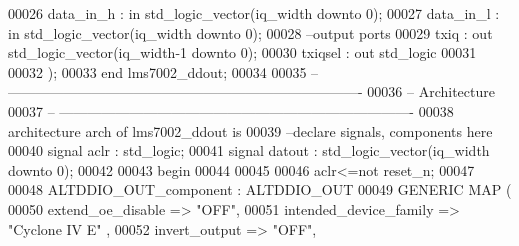 \begin{DoxyCode}
00026         \textcolor{vhdlchar}{data_in_h}   \textcolor{vhdlchar}{:} \textcolor{keywordflow}{in} \textcolor{comment}{std\_logic\_vector}\textcolor{vhdlchar}{(}\textcolor{vhdlchar}{iq_width} \textcolor{keywordflow}{downto} \textcolor{vhdllogic}{}\textcolor{vhdllogic}{0}\textcolor{vhdlchar}{)};
00027         \textcolor{vhdlchar}{data_in_l}   \textcolor{vhdlchar}{:} \textcolor{keywordflow}{in} \textcolor{comment}{std\_logic\_vector}\textcolor{vhdlchar}{(}\textcolor{vhdlchar}{iq_width} \textcolor{keywordflow}{downto} \textcolor{vhdllogic}{}\textcolor{vhdllogic}{0}\textcolor{vhdlchar}{)};
00028 \textcolor{keyword}{        --output ports }
00029         \textcolor{vhdlchar}{txiq}            \textcolor{vhdlchar}{:} \textcolor{keywordflow}{out} \textcolor{comment}{std\_logic\_vector}\textcolor{vhdlchar}{(}\textcolor{vhdlchar}{iq_width}\textcolor{vhdlchar}{-}\textcolor{vhdllogic}{}\textcolor{vhdllogic}{1} \textcolor{keywordflow}{downto} \textcolor{vhdllogic}{}\textcolor{vhdllogic}{0}\textcolor{vhdlchar}{)};
00030         \textcolor{vhdlchar}{txiqsel}     \textcolor{vhdlchar}{:} \textcolor{keywordflow}{out} \textcolor{comment}{std\_logic}
00031         
00032         \textcolor{vhdlchar}{)};
00033 \textcolor{keywordflow}{end} \textcolor{vhdlchar}{lms7002\_ddout};
00034 
00035 \textcolor{keyword}{-- ----------------------------------------------------------------------------}
00036 \textcolor{keyword}{-- Architecture}
00037 \textcolor{keyword}{-- ----------------------------------------------------------------------------}
00038 \textcolor{keywordflow}{architecture} arch \textcolor{keywordflow}{of} lms7002_ddout is
00039 \textcolor{keyword}{--declare signals,  components here}
00040 \textcolor{keywordflow}{signal} \textcolor{vhdlchar}{aclr}     \textcolor{vhdlchar}{:} \textcolor{comment}{std\_logic};
00041 \textcolor{keywordflow}{signal} \textcolor{vhdlchar}{datout}   \textcolor{vhdlchar}{:} \textcolor{comment}{std\_logic\_vector}\textcolor{vhdlchar}{(}\textcolor{vhdlchar}{iq_width} \textcolor{keywordflow}{downto} \textcolor{vhdllogic}{}\textcolor{vhdllogic}{0}\textcolor{vhdlchar}{)};
00042 
00043 \textcolor{vhdlkeyword}{begin}
00044 
00045 
00046 \textcolor{vhdlchar}{aclr}\textcolor{vhdlchar}{<=}\textcolor{keywordflow}{not} \textcolor{vhdlchar}{reset_n};
00047 
00048     ALTDDIO\_OUT\_component : ALTDDIO\_OUT
00049     \textcolor{keywordflow}{GENERIC} \textcolor{keywordflow}{MAP} (
00050         extend\_oe\_disable       => \textcolor{keyword}{"OFF"},
00051         intended\_device\_family  => \textcolor{keyword}{"Cyclone IV E"}  ,
00052         invert\_output               => \textcolor{keyword}{"OFF"},

\end{DoxyCode}
